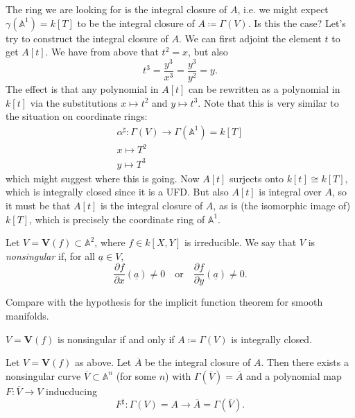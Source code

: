 \documentclass[12pt]{article}
\begin{document}
\begin{example}
	The ring we are looking for is the integral closure of $A$, i.e. we might expect $\gamma(\mathbb{A}^1)=k[T]$ to be the integral closure of $A\coloneqq\Gamma(V)$. Is this the case? Let's try to construct the integral closure of $A$. We can first adjoint the element $t$ to get $A[t]$. We have from above that $t^2=x$, but also 
	\begin{equation*}
		t^3 = \frac{y^3}{x^3}=\frac{y^3}{y^2}=y.
	\end{equation*}
	The effect is that any polynomial in $A[t]$ can be rewritten as a polynomial in $k[t]$ via the substitutions $x\mapsto t^2$ and $y\mapsto t^3$. Note that this is very similar to the situation on coordinate rings:
	\begin{gather*}
		\alpha^\sharp: \Gamma(V) \to \Gamma(\mathbb{A}^1)=k[T] \\
		x \mapsto T^2 \\
		y \mapsto T^3
	\end{gather*}
	which might suggest where this is going. Now $A[t]$ surjects onto $k[t]\cong k[T]$, which is integrally closed since it is a UFD. But also $A[t]$ is integral over $A$, so it must be that $A[t]$ is the integral closure of $A$, as is (the isomorphic image of) $k[T]$, which is precisely the coordinate ring of $\mathbb{A}^1$. 
\end{example}

\begin{definition}
	Let $V=\mathbf{V}(f)\subset\mathbb{A}^2$, where $f\in k[X,Y]$ is irreducible. We say that $V$ is \emph{nonsingular} if, for all $\underline{a}\in V$,
	\begin{equation*}
		\frac{\partial f}{\partial x}(\underline{a})\neq 0 \quad \text{or} \quad \frac{\partial f}{\partial y}(\underline{a})\neq 0.
	\end{equation*}
\end{definition}

\begin{remark}
	Compare with the hypothesis for the implicit function theorem for smooth manifolds.
\end{remark}

\begin{proposition}
	$V=\mathbf{V}(f)$ is nonsingular if and only if $A\coloneqq\Gamma(V)$ is integrally closed.
\end{proposition}

\begin{proposition}
	Let $V=\mathbf{V}(f)$ as above. Let $\overline{A}$ be the integral closure of $A$. Then there exists a nonsingular curve $\overline{V}\subset\mathbb{A}^n$ (for some $n$) with $\Gamma(\overline{V})=\overline{A}$ and a polynomial map $F:\overline{V}\to V$ inducducing 
	\begin{equation*}
		F^\sharp: \Gamma(V)=A \to \overline{A}=\Gamma(\overline{V}).
	\end{equation*}
\end{proposition}
\end{document}
